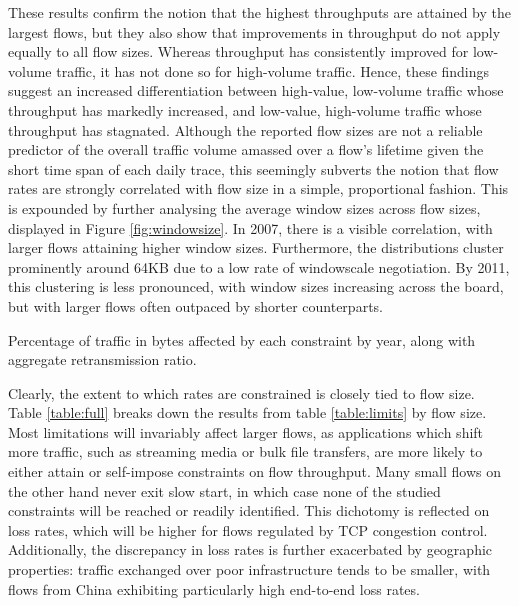 These results confirm the notion that the highest throughputs are attained by the largest flows, but they also show that improvements in throughput do not apply equally to all flow sizes. 
Whereas throughput has consistently improved for low-volume traffic, it has not done so for high-volume traffic. 
Hence, these findings suggest an increased differentiation between high-value, low-volume traffic whose throughput has markedly increased, and low-value, high-volume traffic whose throughput has stagnated.
Although the reported flow sizes are not a reliable predictor of the overall traffic volume amassed over a flow's lifetime given the short time span of each daily trace, this seemingly subverts the notion that flow rates are strongly correlated with flow size in a simple, proportional fashion.  
This is expounded by further analysing the average window sizes across flow sizes, displayed in Figure \ref{fig:windowsize}.
In 2007, there is a visible correlation, with larger flows attaining higher window sizes.
Furthermore, the distributions cluster prominently around 64KB due to a low rate of windowscale negotiation.
By 2011, this clustering is less pronounced, with window sizes increasing across the board, but with larger flows often outpaced by shorter counterparts.



\begin{table}\footnotesize
\centering
\caption{
Percentage of traffic in bytes affected by each constraint by year, along with aggregate retransmission ratio.}
\label{table:full}
\end{table}

Clearly, the extent to which rates are constrained is closely tied to flow size. 
Table \ref{table:full} breaks down the results from table \ref{table:limits} by flow size. 
Most limitations will invariably affect larger flows, as applications which shift more traffic, such as streaming media or bulk file transfers, are more likely to either attain or self-impose constraints on flow throughput. 
Many small flows on the other hand never exit slow start, in which case none of the studied constraints will be reached or readily identified. 
This dichotomy is reflected on loss rates, which will be higher for flows regulated by \ac{TCP} congestion control.
Additionally, the discrepancy in loss rates is further exacerbated by geographic properties: traffic exchanged over poor infrastructure tends to be smaller, with flows from China exhibiting particularly high end-to-end loss rates. 

